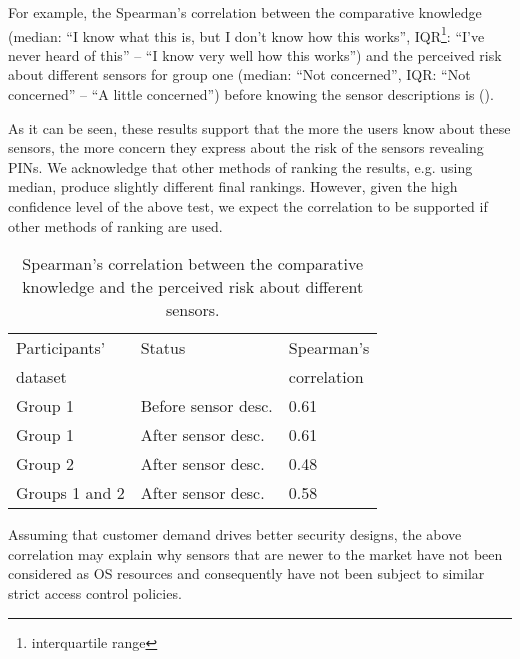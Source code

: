 \documentclass[10pt,twocolumn]{article}
\begin{document}
For example, the Spearman's correlation between the comparative knowledge (median: ``I know what this is, but I don't know how this works'', IQR\footnote{interquartile range}: ``I've never heard of this'' -- ``I know very well how this works'') 
and the perceived risk about different sensors for group one (median: ``Not concerned'', IQR: ``Not concerned'' -- ``A little concerned'') before knowing the sensor descriptions is  (). 

As it can be seen, these results support that the more the users know about these sensors, the more concern they express about the risk of the sensors revealing PINs. 
We acknowledge that other methods of ranking the results, e.g. using median, produce slightly different final rankings. 
However, given the high confidence level of the above test, we expect the correlation to be supported if other methods of ranking are used. 

\begin{table}[t]
\centering
\begin{tabular}{|l|l|l|}
\hline
Participants' & Status & Spearman's \\
 dataset &  & correlation\\
\hline
Group 1& Before sensor desc.& 0.61\\
Group 1& After sensor desc.& 0.61 \\
Group 2& After sensor desc.& 0.48\\
Groups 1 and 2 & After sensor desc. & 0.58 \\
\hline
\end{tabular}
\caption{Spearman's correlation between the comparative knowledge and the perceived risk about different sensors.}
\label{spearman}
\end{table}



Assuming that customer demand drives better security designs, the above correlation may explain why sensors that are newer to the market have not been considered as OS resources and consequently have not been subject to similar strict access control policies. 
\end{document}
